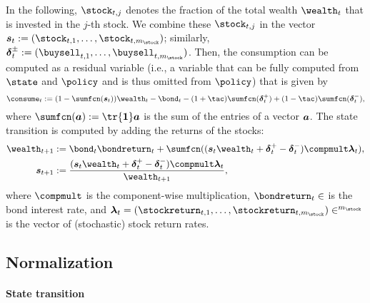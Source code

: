 In the following,
$\stock_{t,j}$ denotes the fraction of the total wealth $\wealth_t$
that is invested in the $j$-th stock.
We combine these  $\stock_{t,j}$
in the vector $\vstock_t := (\stock_{t,1}, \dotsc, \stock_{t,m_{\stock}})$;
similarly, $\vbuysell_t := (\buysell_{t,1}, \dotsc, \buysell_{t,m_{\stock}})$.
Then, the consumption can be computed as a residual variable
(i.e., a variable that can be fully computed from $\state$ and $\policy$
and is thus omitted from $\policy$)
that is given by
\begin{equation}
  \consume_t
  := (1 - \sumfcn(\vstock_t)) \wealth_t - \bond_t -
  (1 + \tac) \sumfcn(\vbuy_t) + (1 - \tac) \sumfcn(\vsell_t),
\end{equation}
where $\sumfcn(\*a) := \tr{\*1} \*a$
is the sum of the entries of a vector ${\boldsymbol{a}}$.
The state transition is computed by adding the returns of the stocks:
\begin{subequations}
  \begin{align}
    \wealth_{t+1}
    &:= \bond_t \bondreturn_t +
    \sumfcn(
      (\vstock_t \wealth_t + \vbuy_t - \vsell_t) \compmult \vstockreturn_t
    ),\\
    \vstock_{t+1}
    &:= \frac{
      (\vstock_t \wealth_t + \vbuy_t - \vsell_t) \compmult \vstockreturn_t
    }{\wealth_{t+1}},
  \end{align}
\end{subequations}
where $\compmult$ is the component-wise multiplication,
$\bondreturn_t \in \real$ is the bond interest rate, and
$
  \vstockreturn_t
  = (\stockreturn_{t,1}, \dotsc, \stockreturn_{t,m_{\stock}})
  \in \real^{m_{\stock}}
$
is the vector of (stochastic) stock return rates.

\subsection{Normalization}
\label{sec:832normalized}

\paragraph{State transition}

